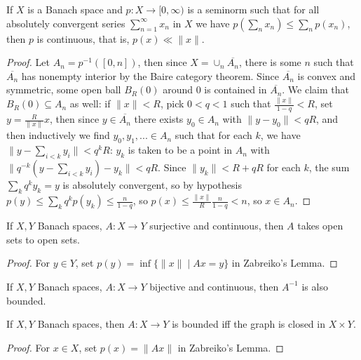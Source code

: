 \documentclass[letterpaper,11pt]{report}
\begin{document}
\begin{lem} If $X$ is a Banach space and $p : X \rightarrow [0,\infty)$ is a seminorm such that for all absolutely convergent series $\sum_{n=1}^\infty x_n$ in $X$ we have $p(\sum_n x_n) \le \sum_n p(x_n)$, then $p$ is continuous, that is, $p(x) \ll \|x\|$.
\end{lem}
\begin{proof} Let $A_n = p^{-1}([0,n])$, then since $X = \cup_n \overline{A_n}$, there is some $n$ such that $\overline{A_n}$ has nonempty interior by the Baire category theorem. Since $\overline{A_n}$ is convex and symmetric, some open ball $B_R(0)$ around $0$ is contained in $\overline{A_n}$. We claim that $B_R(0) \subseteq A_n$ as well: if $\|x\| < R$, pick $0 < q < 1$ such that $\frac{\|x\|}{1-q} < R$, set $y = \frac{R}{\|x\|}x$, then since $y \in \overline{A_n}$ there exists $y_0 \in A_n$ with $\|y - y_0\| < qR$, and then inductively we find $y_0, y_1, ... \in A_n$ such that for each $k$, we have $\|y - \sum_{i<k} y_i\| < q^kR$: $y_k$ is taken to be a point in $A_n$ with $\|q^{-k}(y - \sum_{i<k} y_i) - y_k\| < qR$. Since $\|y_k\| < R + qR$ for each $k$, the sum $\sum_k q^k y_k = y$ is absolutely convergent, so by hypothesis $p(y) \le \sum_k q^kp(y_k) \le \frac{n}{1-q}$, so $p(x) \le \frac{\|x\|}{R}\frac{n}{1-q} < n$, so $x \in A_n$.
\end{proof}

\begin{thm} If $X,Y$ Banach spaces, $A:X\rightarrow Y$ surjective and continuous, then $A$ takes open sets to open sets.
\end{thm}
\begin{proof} For $y \in Y$, set $p(y) = \inf \{\|x\| \mid Ax = y\}$ in Zabreiko's Lemma.
\end{proof}

\begin{thm} If $X,Y$ Banach spaces, $A:X\rightarrow Y$ bijective and continuous, then $A^{-1}$ is also bounded.
\end{thm}

\begin{thm} If $X, Y$ Banach spaces, then $A:X\rightarrow Y$ is bounded iff the graph is closed in $X\times Y$.
\end{thm}
\begin{proof} For $x \in X$, set $p(x) = \|Ax\|$ in Zabreiko's Lemma.
\end{proof}
\end{document}
